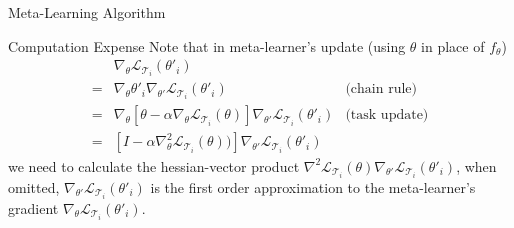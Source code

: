 \documentclass[compress]{beamer}
\begin{document}
\begin{frame}[allowframebreaks]{Meta-Learning Algorithm}
    \begin{block}{Computation Expense}
        Note that in meta-learner's update (using $\theta$ in place of $f_{\theta}$)
        \begin{align*}
             & \nabla_{\theta}\mathcal{L}_{\mathcal{T}_i}(\theta'_i) & \\
            = &  \nabla_{\theta} \theta'_i \nabla_{\theta'} \mathcal{L}_{\mathcal{T}_i}(\theta'_i) & \text{(chain rule)} \\
            = & \nabla_{\theta} \left[\theta-\alpha\nabla_{\theta}\mathcal{L}_{\mathcal{T}_i}(\theta)\right] \nabla_{\theta'} \mathcal{L}_{\mathcal{T}_i}(\theta'_i)  & \text{(task update)}\\
            = & \left[ I -\alpha\nabla^2_{\theta}\mathcal{L}_{\mathcal{T}_i}(\theta)) \right] \nabla_{\theta'} \mathcal{L}_{\mathcal{T}_i}(\theta'_i) &
        \end{align*}
        we need to calculate the hessian-vector product $\nabla^2 \mathcal{L}_{\mathcal{T}_i}(\theta)\nabla_{\theta'} \mathcal{L}_{\mathcal{T}_i}(\theta'_i)$, when omitted, $\nabla_{\theta'} \mathcal{L}_{\mathcal{T}_i}(\theta'_i)$ is the first order approximation to the meta-learner's gradient $\nabla_{\theta}\mathcal{L}_{\mathcal{T}_i}(\theta'_i)$.
    \end{block}


\end{frame}
\end{document}
